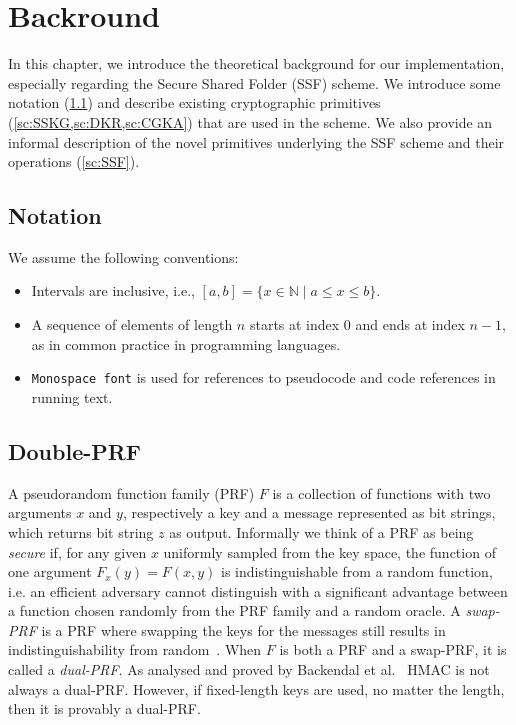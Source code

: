 \chapter{Backround}\label{ch:background}

In this chapter, we introduce the theoretical
background for our implementation, especially regarding the Secure Shared Folder 
(SSF) scheme. We introduce some notation (\cref{sc:notation}) and
describe existing cryptographic primitives (\cref{sc:SSKG,sc:DKR,sc:CGKA})
that are used in the scheme.
We also provide an informal description of the novel primitives 
underlying the SSF scheme and their operations (\cref{sc:SSF}).

\section{Notation}\label{sc:notation}

We assume the following conventions:
\begin{itemize}
    \item Intervals are inclusive, i.e., $[a, b] = \{x \in \mathbb{N} \mid a \leq x \leq b\}$.
    \item A sequence of elements of length $n$ starts at index $0$ and ends at index $n-1$, as in common practice in programming languages.
    \item \texttt{Monospace font} is used for references to pseudocode and code references in running text.
\end{itemize}

\section{Double-PRF}\label{sc:DPRF}

A pseudorandom function family (PRF) $F$ is a collection of functions
with two arguments $x$ and $y$, respectively a key and a message
represented as bit strings, which returns bit string $z$ as output.
Informally we think of a PRF as being \textit{secure} if, for any given $x$
uniformly sampled from the key space, the function of one argument
$F_x(y) = F(x, y)$ is indistinguishable from a random function, i.e.
an efficient adversary cannot distinguish with a significant advantage
between a function chosen randomly from the PRF family and a random oracle.
A \textit{swap-PRF} is a PRF where swapping the keys for the messages
still results in indistinguishability from random~\cite{EPRINT:BelLys15}.
When $F$ is both a PRF and a swap-PRF, it is called a \textit{dual-PRF}.
As analysed and proved by Backendal et al.~\cite{C:BBGS23} HMAC is not always a
dual-PRF. However, if fixed-length keys are used, no matter the length,
then it is provably a dual-PRF.

